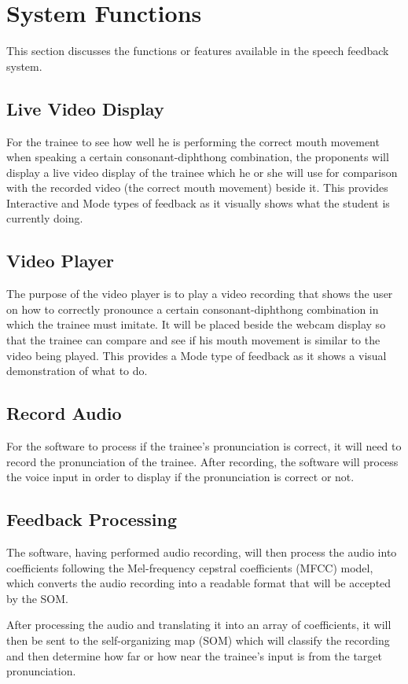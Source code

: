 \section{System Functions}
This section discusses the functions or features available in the speech feedback system.

\subsection{Live Video Display}
For the trainee to see how well he is performing the correct mouth movement when speaking a certain consonant-diphthong combination, the proponents will display a live video display of the trainee which he or she will use for comparison with the recorded video (the correct mouth movement) beside it. This provides Interactive and Mode types of feedback as it visually shows what the student is currently doing.

\subsection{Video Player}
The purpose of the video player is to play a video recording that shows the user on how to correctly pronounce a certain consonant-diphthong combination in which the trainee must imitate. It will be placed beside the webcam display so that the trainee can compare and see if his mouth movement is similar to the video being played. This provides a Mode type of feedback as it shows a visual demonstration of what to do.

\subsection{Record Audio}
For the software to process if the trainee's pronunciation is correct, it will need to record the pronunciation of the trainee. After recording, the software will process the voice input in order to display if the pronunciation is correct or not.

\subsection{Feedback Processing}
The software, having performed audio recording, will then process the audio into coefficients following the Mel-frequency cepstral coefficients (MFCC) model, which converts the audio recording into a readable format that will be accepted by the SOM.

After processing the audio and translating it into an array of coefficients, it will then be sent to the self-organizing map (SOM) which will classify the recording and then determine how far or how near the trainee's input is from the target pronunciation.

